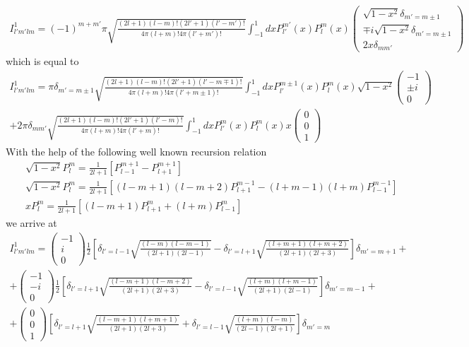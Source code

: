 \documentclass[aps,prb,floatfix,epsfig,singlecolumn,showpacs,preprintnumbers]{revtex4}
\begin{document}
\begin{eqnarray}
I^1_{l'm'lm}=(-1)^{m+m'}\pi
\sqrt{\frac{(2l+1)(l-m)!(2l'+1)(l'-m')!}{4\pi(l+m)! 4\pi (l'+m')!}}
\int_{-1}^1 dx 
 P_{l'}^{m'}(x) P_l^m(x) 
 \left(
\begin{array}{c}
\sqrt{1-x^2} \delta_{m'=m\pm 1}\\
\mp i \sqrt{1-x^2}  \delta_{m'=m\pm 1}\\
2 x \delta_{mm'}
\end{array}
\right)
\end{eqnarray}
which is equal to 
\begin{eqnarray}
I^1_{l'm'lm}=
\pi \delta_{m'=m\pm 1}
\sqrt{\frac{(2l+1)(l-m)!(2l'+1)(l'-m\mp 1)!}{4\pi(l+m)! 4\pi (l'+m\pm 1)!}}
\int_{-1}^1 dx 
 P_{l'}^{m\pm 1}(x) P_l^m(x) 
\sqrt{1-x^2} 
 \left(
\begin{array}{c}
-1 \\
\pm i
\\
0\end{array}
\right)
\nonumber\\
+
2\pi \delta_{mm'}
\sqrt{\frac{(2l+1)(l-m)!(2l'+1)(l'-m)!}{4\pi(l+m)! 4\pi (l'+m)!}}
\int_{-1}^1 dx 
 P_{l'}^{m}(x) P_l^m(x) x 
 \left(
\begin{array}{c}
0\\
0\\
1
\end{array}
\right)
\end{eqnarray}
With the help of the following well known recursion relation
\begin{eqnarray}
&& \sqrt{1-x^2}P_l^m = \frac{1}{2l+1}\left[P_{l-1}^{m+1}-P_{l+1}^{m+1}\right]
\\
&& \sqrt{1-x^2}P_l^m = \frac{1}{2l+1}
\left[(l-m+1)(l-m+2)P_{l+1}^{m-1}-(l+m-1)(l+m)P_{l-1}^{m-1}\right]
\\
&& x P_l^m = \frac{1}{2l+1} \left[
(l-m+1)P_{l+1}^m+(l+m)P_{l-1}^m
\right]
\end{eqnarray}
we arrive at
\begin{eqnarray}
I^1_{l'm'lm}=
\left(
\begin{array}{c}
-1\\
i\\
0
\end{array}
\right)
\frac{1}{2}\left[
\delta_{l'=l-1}
\sqrt{\frac{(l-m)(l-m-1)}{(2l+1)(2l-1)}}-
\delta_{l'=l+1}
\sqrt{\frac{(l+m+1)(l+m+2)}{(2l+1)(2l+3)}}
\right]\delta_{m'=m+1}
+\\+
\left(
\begin{array}{c}
-1\\
-i\\
0
\end{array}
\right)
\frac{1}{2}\left[
\delta_{l'=l+1}
\sqrt{\frac{(l-m+1)(l-m+2)}{(2l+1)(2l+3)}}-
\delta_{l'=l-1}
\sqrt{\frac{(l+m)(l+m-1)}{(2l+1)(2l-1)}}
\right]\delta_{m'=m-1}
+\\+
\left(
\begin{array}{c}
0\\
0\\
1
\end{array}
\right)
\left[
\delta_{l'=l+1}
\sqrt{\frac{(l-m+1)(l+m+1)}{(2l+1)(2l+3)}}+
\delta_{l'=l-1}
\sqrt{\frac{(l+m)(l-m)}{(2l-1)(2l+1)}}
\right]\delta_{m'=m}
\end{eqnarray}
\end{document}
